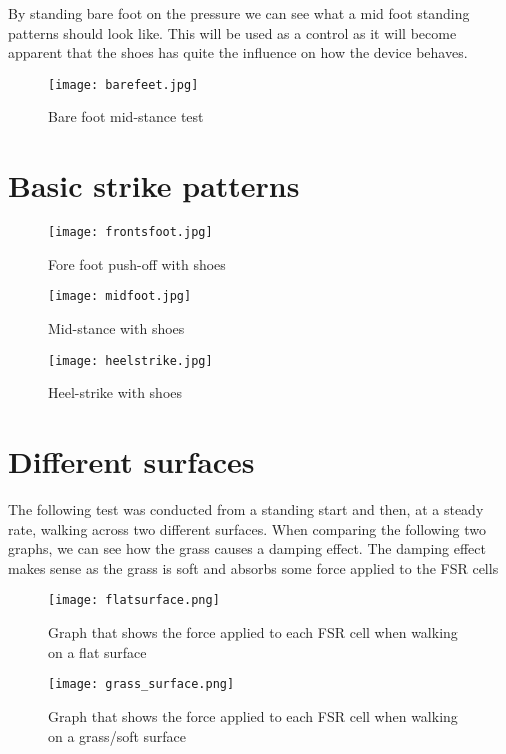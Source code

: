 By standing bare foot on the pressure we can see what a mid foot standing patterns should look like. This will be used as a control as it will become apparent that the shoes has quite the influence on how the device behaves.
\begin{figure}[!htb]
    \centering
    \texttt{[image: barefeet.jpg]}
    \caption{Bare foot mid-stance test}
    \label{fig:calibration}
\end{figure}
\section{Basic strike patterns}
\label{sec:basicstrike}
\begin{figure}[!htb]
    \centering
    \texttt{[image: frontsfoot.jpg]}
    \caption{Fore foot push-off with shoes}
    \label{fig:frontstrike}
\end{figure}
\begin{figure}[!htb]
    \centering
    \texttt{[image: midfoot.jpg]}
    \caption{Mid-stance with shoes}
    \label{fig:midstrike}
\end{figure}
\clearpage
\begin{figure}[!htb]
    \centering
    \texttt{[image: heelstrike.jpg]}
    \caption{Heel-strike with shoes}
    \label{fig:hellstrike}
\end{figure}
\clearpage
\section{Different surfaces}
\label{sec:surfaces}

The following test was conducted from a standing start and then, at a steady rate, walking across two different surfaces. When comparing the following two graphs, we can see how the grass causes a damping effect. The damping effect makes sense as the grass is soft and absorbs some force applied to the FSR cells  

\begin{figure}[!htb]
    \centering
    \texttt{[image: flatsurface.png]}
    \caption{Graph that shows the force applied to each FSR cell when walking on a flat surface}
    \label{fig:hardflat}
\end{figure}

\begin{figure}[!htb]
    \centering
    \texttt{[image: grass\_surface.png]}
    \caption{Graph that shows the force applied to each FSR cell when walking on a grass/soft surface}
    \label{fig:softsurf}
\end{figure}
\clearpage

